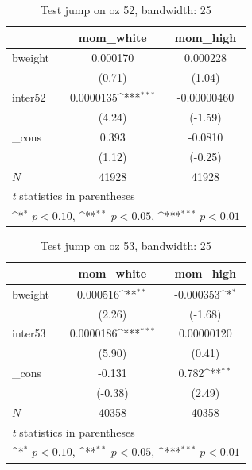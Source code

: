 \documentclass[a4paper,11pt]{article}
\begin{document}
\begin{table}[htbp]\centering
\def\sym#1{\ifmmode^{#1}\else\(^{#1}\)\fi}
\caption{Test jump on oz 52, bandwidth: 25}
\label{A4.oz52}
\begin{tabular}{l*{2}{c}}
\hline\hline
            &\multicolumn{1}{c}{mom\_white}&\multicolumn{1}{c}{mom\_high}\\
\hline
bweight     &    0.000170         &    0.000228         \\
            &      (0.71)         &      (1.04)         \\
[1em]
inter52     &   0.0000135\sym{***}& -0.00000460         \\
            &      (4.24)         &     (-1.59)         \\
[1em]
\_cons      &       0.393         &     -0.0810         \\
            &      (1.12)         &     (-0.25)         \\
\hline
\(N\)       &       41928         &       41928         \\
\hline\hline
\multicolumn{3}{l}{\footnotesize \textit{t} statistics in parentheses}\\
\multicolumn{3}{l}{\footnotesize \sym{*} \(p<0.10\), \sym{**} \(p<0.05\), \sym{***} \(p<0.01\)}\\
\end{tabular}
\end{table}



\begin{table}[htbp]\centering
\def\sym#1{\ifmmode^{#1}\else\(^{#1}\)\fi}
\caption{Test jump on oz 53, bandwidth: 25}
\label{A4.oz53}
\begin{tabular}{l*{2}{c}}
\hline\hline
            &\multicolumn{1}{c}{mom\_white}&\multicolumn{1}{c}{mom\_high}\\
\hline
bweight     &    0.000516\sym{**} &   -0.000353\sym{*}  \\
            &      (2.26)         &     (-1.68)         \\
[1em]
inter53     &   0.0000186\sym{***}&  0.00000120         \\
            &      (5.90)         &      (0.41)         \\
[1em]
\_cons      &      -0.131         &       0.782\sym{**} \\
            &     (-0.38)         &      (2.49)         \\
\hline
\(N\)       &       40358         &       40358         \\
\hline\hline
\multicolumn{3}{l}{\footnotesize \textit{t} statistics in parentheses}\\
\multicolumn{3}{l}{\footnotesize \sym{*} \(p<0.10\), \sym{**} \(p<0.05\), \sym{***} \(p<0.01\)}\\
\end{tabular}
\end{table}
\end{document}
